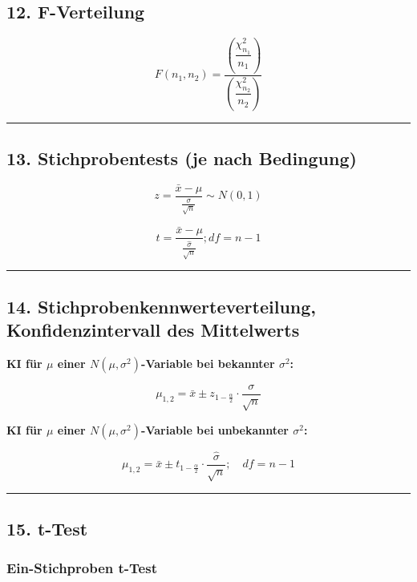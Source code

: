 \documentclass[
]{article}
\begin{document}
\subsection{12. F-Verteilung}\label{f-verteilung}

\[F(n_1, n_2) = \frac{\left(\dfrac{\chi_{n_1}^2}{n_1}\right)}{\left(\dfrac{\chi_{n_2}^2}{n_2}\right)}\]

\begin{center}\rule{0.5\linewidth}{0.5pt}\end{center}

\subsection{13. Stichprobentests (je nach
Bedingung)}\label{stichprobentests-je-nach-bedingung}

\[z = \frac{\bar{x} - \mu}{\frac{\sigma}{\sqrt{n}}} \sim N(0, 1)\]

\[t = \frac{\bar{x} - \mu}{\frac{\hat{\sigma}}{\sqrt{n}}} ; df = n-1\]

\begin{center}\rule{0.5\linewidth}{0.5pt}\end{center}

\subsection{14. Stichprobenkennwerteverteilung, Konfidenzintervall des
Mittelwerts}\label{stichprobenkennwerteverteilung-konfidenzintervall-des-mittelwerts}

\textbf{KI für \(\mu\) einer \(N(\mu, \sigma^2)\)-Variable bei bekannter
\(\sigma^2\):}

\[\mu_{1,2} = \bar{x} \pm z_{1 - \frac{\alpha}{2}} \cdot \frac{\sigma}{\sqrt{n}}\]

\textbf{KI für \(\mu\) einer \(N(\mu, \sigma^2)\)-Variable bei
unbekannter \(\sigma^2\):}

\[\mu_{1,2} = \bar{x} \pm t_{1 - \frac{\alpha}{2}} \cdot \frac{\hat{\sigma}}{\sqrt{n}}; \quad df = n - 1\]

\begin{center}\rule{0.5\linewidth}{0.5pt}\end{center}

\subsection{15. t-Test}\label{t-test}

\subsubsection{Ein-Stichproben t-Test}\label{ein-stichproben-t-test}
\end{document}

